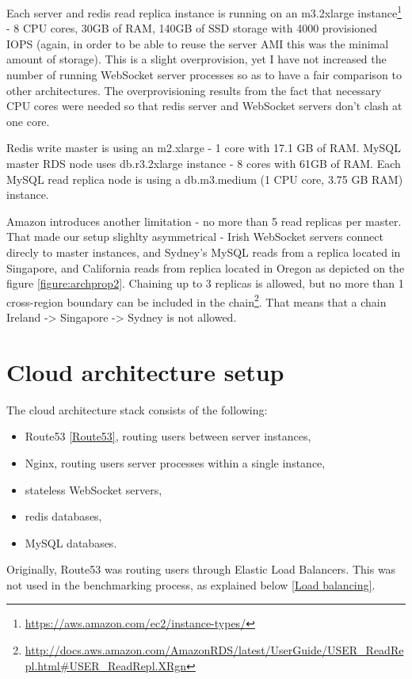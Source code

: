 \documentclass{uvamscse}
\begin{document}
Each server and redis read replica instance is running on an m3.2xlarge instance\footnote{\url{https://aws.amazon.com/ec2/instance-types/}} - 8 CPU cores, 30GB of RAM, 140GB of SSD storage with 4000 provisioned IOPS (again, in order to be able to reuse the server AMI this was the minimal amount of storage). This is a slight overprovision, yet I have not increased the number of running WebSocket server processes so as to have a fair comparison to other architectures. The overprovisioning results from the fact that necessary CPU cores were needed so that redis server and WebSocket servers don't clash at one core.

Redis write master is using an m2.xlarge - 1 core with 17.1 GB of RAM. MySQL master RDS node uses db.r3.2xlarge instance - 8 cores with 61GB of RAM. Each MySQL read replica node is using a db.m3.medium (1 CPU core, 3.75 GB RAM) instance.

Amazon introduces another limitation - no more than 5 read replicas per master. That made our setup slighlty asymmetrical - Irish WebSocket servers connect direcly to master instances, and Sydney's MySQL reads from a replica located in Singapore, and California reads from replica located in Oregon as depicted on the figure \ref{figure:archprop2}. Chaining up to 3 replicas is allowed, but no more than 1 cross-region boundary can be included in the chain\footnote{\url{http://docs.aws.amazon.com/AmazonRDS/latest/UserGuide/USER_ReadRepl.html\#USER\_ReadRepl.XRgn}}. That means that a chain Ireland -> Singapore -> Sydney is not allowed.

\section{Cloud architecture setup} \label{Cloud architecture setup}
The cloud architecture stack consists of the following:
\begin{itemize}
  \item Route53 \ref{Route53}, routing users between server instances,
  \item Nginx, routing users server processes within a single instance,
  \item stateless WebSocket servers,
  \item redis databases,
  \item MySQL databases.
\end{itemize}

Originally, Route53 was routing users through Elastic Load Balancers. This was not used in the benchmarking process, as explained below \ref{Load balancing}.
\end{document}
